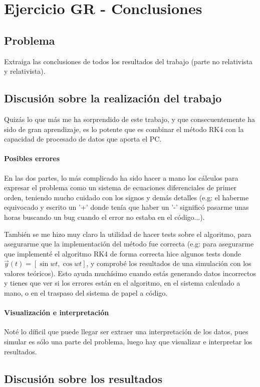\section{Ejercicio GR - Conclusiones}

\subsection{Problema}

Extraiga las conclusiones de todos los resultados del trabajo (parte no relativista y relativista).


\subsection{Discusión sobre la realización del trabajo}

Quizás lo que más me ha sorprendido de este trabajo, y que consecuentemente ha sido de gran aprendizaje, es lo potente que es combinar el método RK4 con la capacidad de procesado de datos que aporta el PC. 


\paragraph{Posibles errores}
En las dos partes, lo más complicado ha sido hacer a mano los cálculos para expresar el problema como un sistema de ecuaciones diferenciales de primer orden, teniendo mucho cuidado con los signos y demás detalles (e.g: el haberme equivocado y escrito un '+' donde tenía que haber un '-' significó pasarme unas horas buscando un bug cuando el error no estaba en el código...).

También se me hizo muy claro la utilidad de hacer tests sobre el algoritmo, para asegurarme que la implementación del método fue correcta (e.g: para asegurarme que implementé el algoritmo RK4 de forma correcta hice algunos tests donde $\vec{y}(t) = [\sin wt, \cos wt]$, y comprobé los resultados de una simulación con los valores teóricos). Esto ayuda muchísimo cuando estás generando datos incorrectos y tienes que ver si los errores están en el algoritmo, en el sistema calculado a mano, o en el traspaso del sistema de papel a código.

\paragraph{Visualización e interpretación}

Noté lo díficil que puede llegar ser extraer una interpretación de los datos, pues simular es sólo una parte del problema, luego hay que visualizar e interpretar los resultados.  

\subsection{Discusión sobre los resultados}

